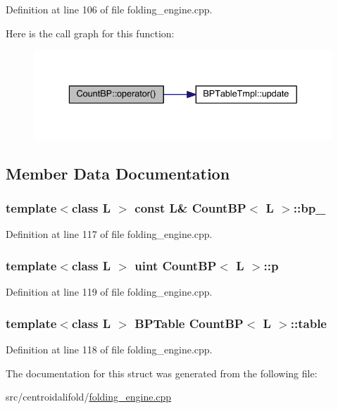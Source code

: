 Definition at line 106 of file folding\+\_\+engine.\+cpp.



Here is the call graph for this function\+:
\nopagebreak
\begin{figure}[H]
\begin{center}
\leavevmode
\includegraphics[width=336pt]{struct_count_b_p_af0d579ca3bf03a8d60a5a82d074f636d_cgraph}
\end{center}
\end{figure}




\subsection{Member Data Documentation}
\hypertarget{struct_count_b_p_a4da16caf4616d8c453998871ba03bbad}{
\subsubsection[{bp\+\_\+}]{\setlength{\rightskip}{0pt plus 5cm}template$<$class L $>$ const L\& {\bf Count\+B\+P}$<$ L $>$\+::bp\+\_\+}}\label{struct_count_b_p_a4da16caf4616d8c453998871ba03bbad}


Definition at line 117 of file folding\+\_\+engine.\+cpp.

\hypertarget{struct_count_b_p_a92de403d8e8a52294a85dbe93ce1e8b9}{
\subsubsection[{p}]{\setlength{\rightskip}{0pt plus 5cm}template$<$class L $>$ {\bf uint} {\bf Count\+B\+P}$<$ L $>$\+::p}}\label{struct_count_b_p_a92de403d8e8a52294a85dbe93ce1e8b9}


Definition at line 119 of file folding\+\_\+engine.\+cpp.

\hypertarget{struct_count_b_p_ae4266a3c6b2c80dc0f8bdb82124630c5}{
\subsubsection[{table}]{\setlength{\rightskip}{0pt plus 5cm}template$<$class L $>$ {\bf B\+P\+Table} {\bf Count\+B\+P}$<$ L $>$\+::table}}\label{struct_count_b_p_ae4266a3c6b2c80dc0f8bdb82124630c5}


Definition at line 118 of file folding\+\_\+engine.\+cpp.



The documentation for this struct was generated from the following file\+:\begin{DoxyCompactItemize}
\item 
src/centroidalifold/\hyperlink{folding__engine_8cpp}{folding\+\_\+engine.\+cpp}\end{DoxyCompactItemize}

